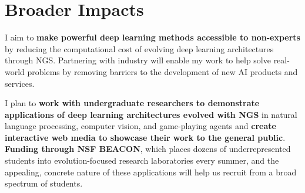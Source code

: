 \section{Broader Impacts}

I aim to \textbf{make powerful deep learning methods accessible to non-experts} by reducing the computational cost of evolving deep learning architectures through NGS.
Partnering with industry will enable my work to help solve real-world problems by removing barriers to the development of new AI products and services.

I plan to \textbf{work with undergraduate researchers to demonstrate applications of deep learning architectures evolved with NGS} in natural language processing, computer vision, and game-playing agents and \textbf{create interactive web media to showcase their work to the general public}.
\textbf{Funding through NSF BEACON}, which places dozens of underrepresented students into evolution-focused research laboratories every summer, and the appealing, concrete nature of these applications will help us recruit from a broad spectrum of students.
